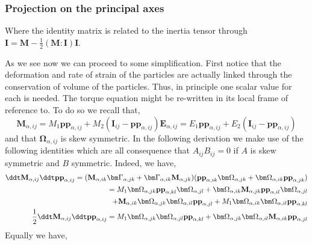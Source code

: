 \subsubsection*{Projection on the principal axes}


Where the identity matrix is related to the inertia tensor through $\textbf{I} = \textbf{M} - \frac{1}{2}(\textbf{M}:\textbf{I})\textbf{I}$. 

As we see now we can proceed to some simplification. 
First notice that the deformation and rate of strain of the particles are actually linked through the conservation of volume of the particles. 
Thus, in principle one scalar value for each is needed. 
The torque equation might be re-written in its local frame of reference to. 
To do so we recall that, 
\begin{equation*}
    \textbf{M}_{\alpha,ij} 
    = M_1 \textbf{pp}_{\alpha,ij}
    + M_2 (\textbf{I}_{ij} - \textbf{pp}_{\alpha,ij})
    \textbf{E}_{\alpha,ij} 
    = E_1 \textbf{pp}_{\alpha,ij}
    + E_2 (\textbf{I}_{ij} - \textbf{pp}_{\alpha,ij})
\end{equation*}
and that $\bm\Omega_{\alpha,ij}$ is skew symmetric. 
In the following derivation we make use of the following identities which are all consequence that $A_{ij}B_{ij} = 0$ if $A$ is skew symmetric and $B$ symmetric. 
Indeed, we have, 
\begin{align*}
    \ddt \textbf{M}_{\alpha,ij}
    \ddt \textbf{pp}_{\alpha,ij}
    = 
    (\textbf{M}_{\alpha,ik}  \bm\Gamma_{\alpha,jk}
    +  \bm\Gamma_{\alpha,ik}  \textbf{M}_{\alpha,jk})
    (\textbf{pp}_{\alpha,ik}  \bm\Omega_{\alpha,jk}
    +  \bm\Omega_{\alpha,ik}  \textbf{pp}_{\alpha,jk})\\
    = 
    M_1  \bm\Omega_{\alpha,jk}
    \textbf{pp}_{\alpha,kl}  \bm\Omega_{\alpha,jl}
    +  \bm\Omega_{\alpha,ik}  \textbf{M}_{\alpha,jk}
    \textbf{pp}_{\alpha,il}  \bm\Omega_{\alpha,jl} \\
    + \textbf{M}_{\alpha,ik}  \bm\Omega_{\alpha,jk}
    \bm\Omega_{\alpha,il}  \textbf{pp}_{\alpha,jl}
    + M_1  \bm\Omega_{\alpha,ik}  
    \bm\Omega_{\alpha,il}  \textbf{pp}_{\alpha,kl}\\
    \frac{1}{2}\ddt \textbf{M}_{\alpha,ij}
    \ddt \textbf{pp}_{\alpha,ij}
    = 
     M_1  
     \bm\Omega_{\alpha,jk}
     \bm\Omega_{\alpha,jl}
    \textbf{pp}_{\alpha,kl}  
    +   
    \bm\Omega_{\alpha,jk}  
    \bm\Omega_{\alpha,il} 
    \textbf{M}_{\alpha,ik}
    \textbf{pp}_{\alpha,jl}  
\end{align*}
Equally we have, 

